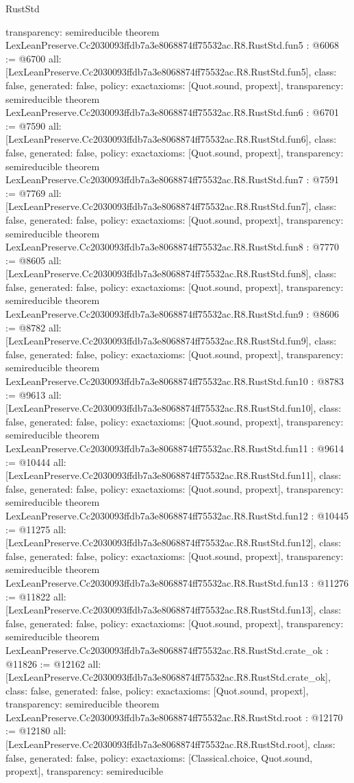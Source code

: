 \begin{lexlean}{RustStd}
\begin{coremodule}
{  transparency: semireducible
}
theorem LexLeanPreserve.Cc2030093ffdb7a3e8068874ff75532ac.R8.RustStd.fun5 : @6068 := @6700 {
  all: [LexLeanPreserve.Cc2030093ffdb7a3e8068874ff75532ac.R8.RustStd.fun5],
  class: false,
  generated: false,
  policy: exact{axioms: [Quot.sound, propext]},
  transparency: semireducible
}
theorem LexLeanPreserve.Cc2030093ffdb7a3e8068874ff75532ac.R8.RustStd.fun6 : @6701 := @7590 {
  all: [LexLeanPreserve.Cc2030093ffdb7a3e8068874ff75532ac.R8.RustStd.fun6],
  class: false,
  generated: false,
  policy: exact{axioms: [Quot.sound, propext]},
  transparency: semireducible
}
theorem LexLeanPreserve.Cc2030093ffdb7a3e8068874ff75532ac.R8.RustStd.fun7 : @7591 := @7769 {
  all: [LexLeanPreserve.Cc2030093ffdb7a3e8068874ff75532ac.R8.RustStd.fun7],
  class: false,
  generated: false,
  policy: exact{axioms: [Quot.sound, propext]},
  transparency: semireducible
}
theorem LexLeanPreserve.Cc2030093ffdb7a3e8068874ff75532ac.R8.RustStd.fun8 : @7770 := @8605 {
  all: [LexLeanPreserve.Cc2030093ffdb7a3e8068874ff75532ac.R8.RustStd.fun8],
  class: false,
  generated: false,
  policy: exact{axioms: [Quot.sound, propext]},
  transparency: semireducible
}
theorem LexLeanPreserve.Cc2030093ffdb7a3e8068874ff75532ac.R8.RustStd.fun9 : @8606 := @8782 {
  all: [LexLeanPreserve.Cc2030093ffdb7a3e8068874ff75532ac.R8.RustStd.fun9],
  class: false,
  generated: false,
  policy: exact{axioms: [Quot.sound, propext]},
  transparency: semireducible
}
theorem LexLeanPreserve.Cc2030093ffdb7a3e8068874ff75532ac.R8.RustStd.fun10 : @8783 := @9613 {
  all: [LexLeanPreserve.Cc2030093ffdb7a3e8068874ff75532ac.R8.RustStd.fun10],
  class: false,
  generated: false,
  policy: exact{axioms: [Quot.sound, propext]},
  transparency: semireducible
}
theorem LexLeanPreserve.Cc2030093ffdb7a3e8068874ff75532ac.R8.RustStd.fun11 : @9614 := @10444 {
  all: [LexLeanPreserve.Cc2030093ffdb7a3e8068874ff75532ac.R8.RustStd.fun11],
  class: false,
  generated: false,
  policy: exact{axioms: [Quot.sound, propext]},
  transparency: semireducible
}
theorem LexLeanPreserve.Cc2030093ffdb7a3e8068874ff75532ac.R8.RustStd.fun12 : @10445 := @11275 {
  all: [LexLeanPreserve.Cc2030093ffdb7a3e8068874ff75532ac.R8.RustStd.fun12],
  class: false,
  generated: false,
  policy: exact{axioms: [Quot.sound, propext]},
  transparency: semireducible
}
theorem LexLeanPreserve.Cc2030093ffdb7a3e8068874ff75532ac.R8.RustStd.fun13 : @11276 := @11822 {
  all: [LexLeanPreserve.Cc2030093ffdb7a3e8068874ff75532ac.R8.RustStd.fun13],
  class: false,
  generated: false,
  policy: exact{axioms: [Quot.sound, propext]},
  transparency: semireducible
}
theorem LexLeanPreserve.Cc2030093ffdb7a3e8068874ff75532ac.R8.RustStd.crate_ok : @11826 := @12162 {
  all: [LexLeanPreserve.Cc2030093ffdb7a3e8068874ff75532ac.R8.RustStd.crate_ok],
  class: false,
  generated: false,
  policy: exact{axioms: [Quot.sound, propext]},
  transparency: semireducible
}
theorem LexLeanPreserve.Cc2030093ffdb7a3e8068874ff75532ac.R8.RustStd.root : @12170 := @12180 {
  all: [LexLeanPreserve.Cc2030093ffdb7a3e8068874ff75532ac.R8.RustStd.root],
  class: false,
  generated: false,
  policy: exact{axioms: [Classical.choice, Quot.sound, propext]},
  transparency: semireducible
}


\end{coremodule}
\end{lexlean}

